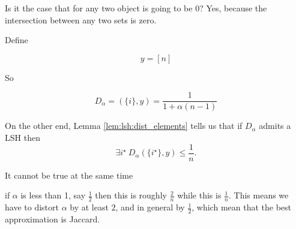 Is it the case that for any two object is going to be 0? Yes, because the intersection between any two sets is zero.

Define

\begin{equation}
	y = [n]
\end{equation}

So 

\begin{equation}
	D_\alpha = (\{i\}, y) = \frac{1}{1 + \alpha(n-1)}
\end{equation}

On the other end, Lemma \ref{lem:lsh:dist_elements} tells us that if $D_\alpha$ admits a LSH then $$\exists i^\star\ D_\alpha(\{i^\star\}, y) \leq \frac{1}{n}.$$

It cannot be true at the same time

if $\alpha$ is less than 1, say $\frac{1}{2}$ then this is roughly $\frac{2}{n}$ while this is $\frac{1}{n}$. This means we have to distort $\alpha$ by at least $2$, and in general by $\frac{1}{2}$, which mean that the best approximation is Jaccard.
